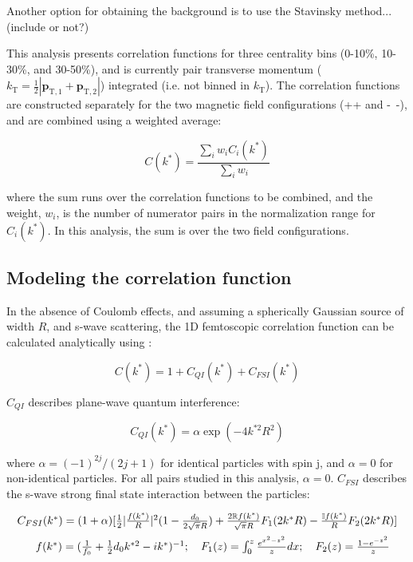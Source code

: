 \documentclass[ALICE,manyauthors]{cernphprep}
\begin{document}
Another option for obtaining the background is to use the Stavinsky method...(include or not?)

This analysis presents correlation functions for three centrality bins (0-10\%, 10-30\%, and 30-50\%), and is currently pair transverse momentum ($k_{\mathrm{T}} = \frac{1}{2}|\mathbf{p}_{\mathrm{T,1}}+\mathbf{p}_{\mathrm{T,2}}|$) integrated (i.e. not binned in $k_{\mathrm{T}}$).  
The correlation functions are constructed separately for the two magnetic field configurations (++ and -~-), and are combined using a weighted average:

\begin{equation}
  C(k^{*}) = \frac{\sum\limits_{i}w_{i}C_{i}(k^{*})}{\sum\limits_{i}w_{i}} 
\label{eqn:CombineCfs}
\end{equation}

where the sum runs over the correlation functions to be combined, and the weight, $w_{i}$, is the number of numerator pairs in the normalization range for $C_{i}(k^{*})$.
In this analysis, the sum is over the two field configurations.


\subsection{Modeling the correlation function}
\label{sec:ModelingCF}


In the absence of Coulomb effects, and assuming a spherically Gaussian source of width $R$, and s-wave scattering, the 1D femtoscopic correlation function can be calculated analytically using \cite{Lednicky:82}:

\begin{equation}
 C(k^{*}) = 1 + C_{QI}(k^{*}) + C_{FSI}(k^{*})
\label{eqn:LednickyEqn}
\end{equation}

$C_{QI}$ describes plane-wave quantum interference:

\begin{equation}
 C_{QI}(k^{*}) = \alpha\exp(-4k^{*2}R^{2})
\label{eqn:CQI}
\end{equation}

where $\alpha = (-1)^{2j}/(2j+1)$ for identical particles with spin j, and $\alpha = 0$ for non-identical particles.  
For all pairs studied in this analysis, $\alpha = 0$.  
$C_{FSI}$ describes the s-wave strong final state interaction between the particles:

\begin{equation}
\begin{array}{l}
\vspace{2mm}  %
  C_{FSI}(k^{*}) = (1+\alpha)[\frac{1}{2}|\frac{f(k^{*})}{R}|^2(1-\frac{d_{0}}{2\sqrt{\pi}R})+\frac{2\mathbb{R}f(k^{*})}{\sqrt{\pi}R}F_{1}(2k^{*}R)-\frac{\mathbb{I}f(k^{*})}{R}F_{2}(2k^{*}R)] \\
\vspace{2mm}  %
  ~~~~~f(k^{*}) = (\frac{1}{f_{0}}+\frac{1}{2}d_{0}k^{*2}-ik^{*})^{-1};~~~
  F_{1}(z) = \int_{0}^{z} \frac{e^{x^{2}-z^{2}}}{z}dx;~~~
  F_{2}(z) = \frac{1-e^{-z^{2}}}{z}
\end{array}  
\label{eqn:CFSI}
\end{equation}
\end{document}
